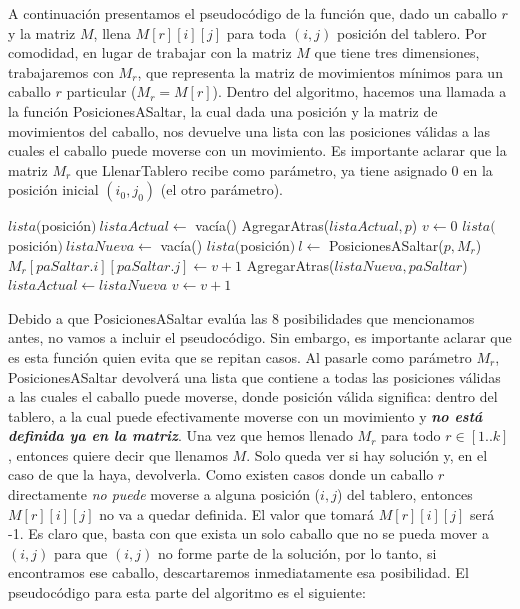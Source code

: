\documentclass[a4paper]{article}
\begin{document}
\noindent A continuación presentamos el pseudocódigo de la función que, dado un caballo $r$ y la matriz $M$, llena $M[r][i][j]$ para toda $(i, j)$ posición del tablero. Por comodidad, en lugar de trabajar con la matriz $M$ que tiene tres dimensiones, trabajaremos con $M_r$, que representa la matriz de movimientos mínimos para un caballo $r$ particular ($M_r = M[r]$). Dentro del algoritmo, hacemos una llamada a la función PosicionesASaltar, la cual dada una posición y la matriz de movimientos del caballo, nos devuelve una lista con las posiciones válidas a las cuales el caballo puede moverse con un movimiento.
\newline Es importante aclarar que la matriz $M_r$ que LlenarTablero recibe como parámetro, ya tiene asignado 0 en la posición inicial $(i_0, j_0)$ (el otro parámetro).

\newpage
\begin{algorithmic}[1]
	\State $lista($posición$) \ listaActual \gets$ vacía()
	\State AgregarAtras($listaActual, p$)
	\State $v \gets 0$
	\newline
		\State $lista($posición$) \ listaNueva \gets$ vacía()
		\newline
			\State $lista($posición$) \ l \gets$ PosicionesASaltar($p, M_r$)
			\newline
				\State $M_r[paSaltar.i][paSaltar.j] \gets v + 1$
				\State AgregarAtras($listaNueva, paSaltar$)
			\EndFor
			\newline
		\EndFor
		\newline
		\State $listaActual \gets listaNueva$
		\State $v \gets v + 1$
	\EndWhile
	\newline
\EndProcedure
\end{algorithmic}
\vspace{0.5cm}
Debido a que PosicionesASaltar evalúa las 8 posibilidades que mencionamos antes, no vamos a incluir el pseudocódigo. Sin embargo, es importante aclarar que es esta función quien evita que se repitan casos. Al pasarle como parámetro $M_r$, PosicionesASaltar devolverá una lista que contiene a todas las posiciones válidas a las cuales el caballo puede moverse, donde posición válida significa: dentro del tablero, a la cual puede efectivamente moverse con un movimiento y \textit{\textbf{no está definida ya en la matriz}}.
\newline Una vez que hemos llenado $M_r$ para todo $r \in [1..k]$, entonces quiere decir que llenamos $M$. Solo queda ver si hay solución y, en el caso de que la haya, devolverla. Como existen casos donde un caballo $r$ directamente \textit{no puede} moverse a alguna posición ($i, j$) del tablero, entonces $M[r][i][j]$ no va a quedar definida. El valor que tomará $M[r][i][j]$ será -1. Es claro que, basta con que exista un solo caballo que no se pueda mover a $(i, j)$ para que $(i, j)$ no forme parte de la solución, por lo tanto, si encontramos ese caballo, descartaremos inmediatamente esa posibilidad.
\newline El pseudocódigo para esta parte del algoritmo es el siguiente:
\vspace{0.4cm}
\end{document}
